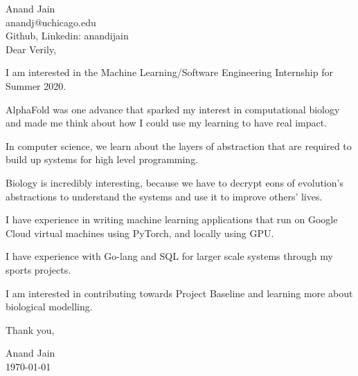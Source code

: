 \documentclass[11pt,a4paper,english]{letter} %
\begin{document}
Anand Jain\\
anandj@uchicago.edu\\
Github, Linkedin: anandijain\\


Dear Verily,

I am interested in the Machine Learning/Software Engineering Internship for Summer 2020.

AlphaFold was one advance that sparked my interest in computational biology and made me think about how I could use my learning to have real impact.

In computer science, we learn about the layers of abstraction that are required to build up systems for high level programming.

Biology is incredibly interesting, because we have to decrypt eons of evolution's abstractions to understand the systems and use it to improve others' lives.

I have experience in writing machine learning applications that run on Google Cloud virtual machines using PyTorch, and locally using GPU.

I have experience with Go-lang and SQL for larger scale systems through my sports projects.

I am interested in contributing towards Project Baseline and learning more about biological modelling.

Thank you, 

Anand Jain\\
\today\\
\end{document}
